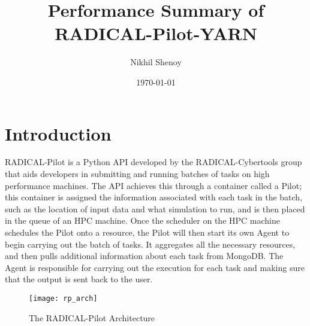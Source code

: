 \documentclass[]{article}
\begin{document}
\title{Performance Summary of RADICAL-Pilot-YARN}
\author{Nikhil Shenoy}
\date{\today}
\maketitle


\section{Introduction}
	RADICAL-Pilot is a Python API developed by the RADICAL-Cybertools group that aids developers in submitting and running batches of tasks on high performance machines. The API achieves this through a container called a Pilot; this container is assigned the information associated with each task in the batch, such as the location of input data and what simulation to run, and is then placed in the queue of an HPC machine. Once the scheduler on the HPC machine schedules the Pilot onto a resource, the Pilot will then start its own Agent to begin carrying out the batch of tasks. It aggregates all the necessary resources, and then pulls additional information about each task from MongoDB. The Agent is responsible for carrying out the execution for each task and making sure that the output is sent back to the user.

	\begin{figure}[H]
		\centering
		\texttt{[image: rp\_arch]}
		\caption{The RADICAL-Pilot Architecture \cite{rp_arch}}
		\label{fig:pipeline_block_diagram}
	\end{figure}
\end{document}
